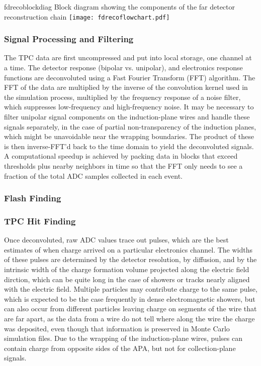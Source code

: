 \begin{cdrfigure}{fdrecoblockdiag}
{Block diagram showing the components of the far detector reconstruction chain}
\texttt{[image: fdrecoflowchart.pdf]}
\end{cdrfigure}


\subsubsection{Signal Processing and Filtering}

The TPC data are first uncompressed and put into local storage, one
channel at a time.  The detector response (bipolar vs. unipolar), and
electronics response functions are deconvoluted using a Fast Fourier
Transform (FFT) algorithm.  The FFT of the data are multiplied by the
inverse of the convolution kernel used in the simulation process,
multiplied by the frequency response of a noise filter, which
suppresses low-frequency and high-frequency noise.  It may be
necessary to filter unipolar signal components on the induction-plane
wires and handle these signals separately, in the case of partial
non-transparency of the induction planes, which might be unavoidable
near the wrapping boundaries.  The product of these is then
inverse-FFT'd back to the time domain to yield the deconvoluted
signals.  A computational speedup is achieved by packing data in
blocks that exceed thresholds plus nearby neighbors in time so that
the FFT only needs to see a fraction of the total ADC samples
collected in each event.

\subsubsection{Flash Finding}


\subsubsection{TPC Hit Finding}

Once deconvoluted, raw ADC values trace out pulses, which are the best
estimates of when charge arrived on a particular electronics channel.
The widths of these pulses are determined by the detector resolution,
by diffusion, and by the intrinsic width of the charge formation
volume projected along the electric field dirction, which can be quite
long in the case of showers or tracks nearly aligned with the electric
field.  Multiple particles may contribute charge to the same pulse,
which is expected to be the case frequently in dense electromagnetic
showers, but can also occur from different particles leaving charge on
segments of the wire that are far apart, as the data from a wire do
not tell where along the wire the charge was deposited, even though
that information is preserved in Monte Carlo simulation files.  Due to
the wrapping of the induction-plane wires, pulses can contain charge
from opposite sides of the APA, but not for collection-plane signals.

